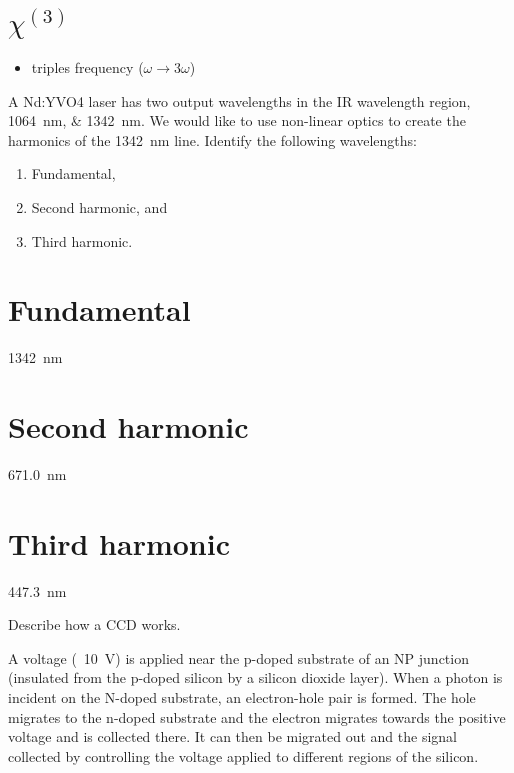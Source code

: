 \documentclass{hw}
\begin{document}
\part{$\chi^{\left(3\right)}$}

\begin{itemize}
    \item triples frequency ($\omega \rightarrow 3\omega$)
\end{itemize}

\problem{}

A Nd:YVO4 laser has two output wavelengths in the IR wavelength region, \SIlist{1064;1342}{\nano\meter}. We would like to use non-linear optics to create the harmonics of the \SI{1342}{\nano\meter} line. Identify the following wavelengths:
\begin{enumerate}
    \item Fundamental,
    \item Second harmonic, and
    \item Third harmonic.
\end{enumerate}

\solution

\part{Fundamental}

\SI{1342}{\nano\meter}

\part{Second harmonic}

\SI{671.0}{\nano\meter}

\part{Third harmonic}

\SI{447.3}{\nano\meter}

\problem{}

Describe how a CCD works.

\solution

A voltage (~\SI{10}{\volt}) is applied near the p-doped substrate of an NP junction (insulated from the p-doped silicon by a silicon dioxide layer). When a photon is incident on the N-doped substrate, an electron-hole pair is formed. The hole migrates to the n-doped substrate and the electron migrates towards the positive voltage and is collected there. It can then be migrated out and the signal collected by controlling the voltage applied to different regions of the silicon.
\end{document}
